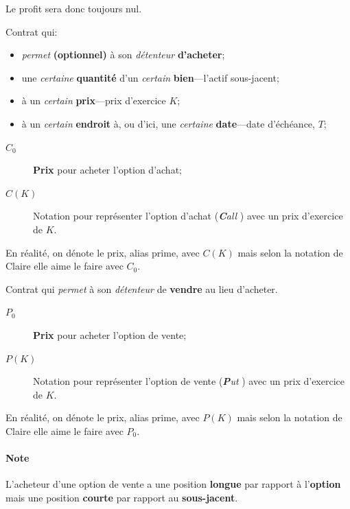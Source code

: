 \documentclass[10pt, french]{article}
\begin{document}
\begin{multicols*}{2}
\begin{definitionNOHFILL}
Le profit sera donc toujours nul.
\end{definitionNOHFILL}


\begin{definitionNOHFILL}
Contrat qui: 
\begin{itemize}[leftmargin = *]
	\item	\textit{permet} \textbf{(optionnel)} à son \textit{détenteur} \textbf{d'acheter};
	\item	une \textit{certaine} \textbf{quantité} d'un \textit{certain} \textbf{bien}---l'actif sous-jacent;	
	\item	à un \textit{certain} \textbf{prix}---prix d'exercice $K$;
	\item	à un \textit{certain} \textbf{endroit} à, ou d'ici, une \textit{certaine} \textbf{date}---date d'échéance, $T$;
\end{itemize}

\begin{distributions}[Notation]
\begin{description}
	\item[$C_{0}$]	\textbf{Prix} pour acheter l'option d'achat;
	\item[$C(K)$]	Notation pour représenter l'option d'achat (\og \textit{\textbf{C}all} \fg{}) avec un prix d'exercice de $K$.
\end{description}
En réalité, on dénote le prix, alias prime, avec $C(K)$ mais selon la notation de Claire elle aime le faire avec $C_{0}$.
\end{distributions}
\end{definitionNOHFILL}

\begin{definitionNOHFILL}
Contrat qui \textit{permet} à son \textit{détenteur} de \textbf{vendre} au lieu d'acheter.

\begin{distributions}[Notation]
\begin{description}
	\item[$P_{0}$]	\textbf{Prix} pour acheter l'option de vente;
	\item[$P(K)$]	Notation pour représenter l'option de vente (\og \textit{\textbf{P}ut} \fg{}) avec un prix d'exercice de $K$.
\end{description}
En réalité, on dénote le prix, alias prime,  avec $P(K)$ mais selon la notation de Claire elle aime le faire avec $P_{0}$.
\end{distributions}

\paragraph*{Note}	L'acheteur d'une option de vente a une position \textbf{longue} par rapport à l'\textbf{option} mais une position \textbf{courte} par rapport au \textbf{sous-jacent}.


\end{definitionNOHFILL}
\end{multicols*}
\end{document}
